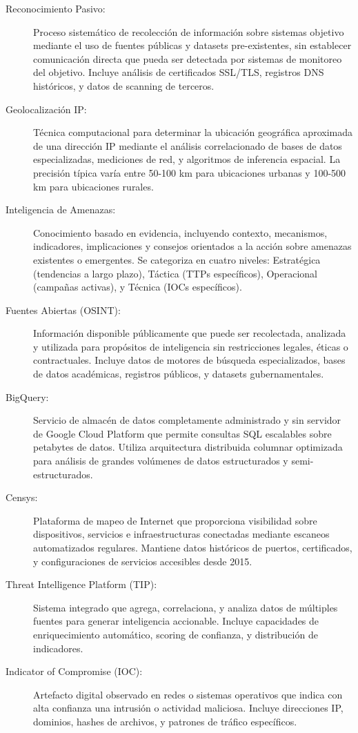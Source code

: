 \begin{description}
    \item[Reconocimiento Pasivo:] Proceso sistemático de recolección de información sobre sistemas objetivo mediante el uso de fuentes públicas y datasets pre-existentes, sin establecer comunicación directa que pueda ser detectada por sistemas de monitoreo del objetivo. Incluye análisis de certificados SSL/TLS, registros DNS históricos, y datos de scanning de terceros.

    \item[Geolocalización IP:] Técnica computacional para determinar la ubicación geográfica aproximada de una dirección IP mediante el análisis correlacionado de bases de datos especializadas, mediciones de red, y algoritmos de inferencia espacial. La precisión típica varía entre 50-100 km para ubicaciones urbanas y 100-500 km para ubicaciones rurales.

    \item[Inteligencia de Amenazas:] Conocimiento basado en evidencia, incluyendo contexto, mecanismos, indicadores, implicaciones y consejos orientados a la acción sobre amenazas existentes o emergentes. Se categoriza en cuatro niveles: Estratégica (tendencias a largo plazo), Táctica (TTPs específicos), Operacional (campañas activas), y Técnica (IOCs específicos).

    \item[Fuentes Abiertas (OSINT):] Información disponible públicamente que puede ser recolectada, analizada y utilizada para propósitos de inteligencia sin restricciones legales, éticas o contractuales. Incluye datos de motores de búsqueda especializados, bases de datos académicas, registros públicos, y datasets gubernamentales.

    \item[BigQuery:] Servicio de almacén de datos completamente administrado y sin servidor de Google Cloud Platform que permite consultas SQL escalables sobre petabytes de datos. Utiliza arquitectura distribuida columnar optimizada para análisis de grandes volúmenes de datos estructurados y semi-estructurados.

    \item[Censys:] Plataforma de mapeo de Internet que proporciona visibilidad sobre dispositivos, servicios e infraestructuras conectadas mediante escaneos automatizados regulares. Mantiene datos históricos de puertos, certificados, y configuraciones de servicios accesibles desde 2015.

    \item[Threat Intelligence Platform (TIP):] Sistema integrado que agrega, correlaciona, y analiza datos de múltiples fuentes para generar inteligencia accionable. Incluye capacidades de enriquecimiento automático, scoring de confianza, y distribución de indicadores.

    \item[Indicator of Compromise (IOC):] Artefacto digital observado en redes o sistemas operativos que indica con alta confianza una intrusión o actividad maliciosa. Incluye direcciones IP, dominios, hashes de archivos, y patrones de tráfico específicos.
\end{description}

